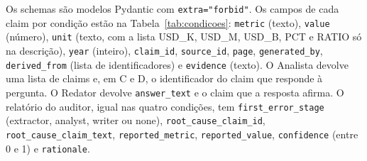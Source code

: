 Os schemas são modelos Pydantic com \texttt{extra="forbid"}. Os campos de cada claim por condição estão na Tabela~\ref{tab:condicoes}: \texttt{metric} (texto), \texttt{value} (número), \texttt{unit} (texto, com a lista USD\_K, USD\_M, USD\_B, PCT e RATIO só na descrição), \texttt{year} (inteiro), \texttt{claim\_id}, \texttt{source\_id}, \texttt{page}, \texttt{generated\_by}, \texttt{derived\_from} (lista de identificadores) e \texttt{evidence} (texto). O Analista devolve uma lista de claims e, em C e D, o identificador do claim que responde à pergunta. O Redator devolve \texttt{answer\_text} e o claim que a resposta afirma. O relatório do auditor, igual nas quatro condições, tem \texttt{first\_error\_stage} (extractor, analyst, writer ou none), \texttt{root\_cause\_claim\_id}, \texttt{root\_cause\_claim\_text}, \texttt{reported\_metric}, \texttt{reported\_value}, \texttt{confidence} (entre 0 e 1) e \texttt{rationale}.
